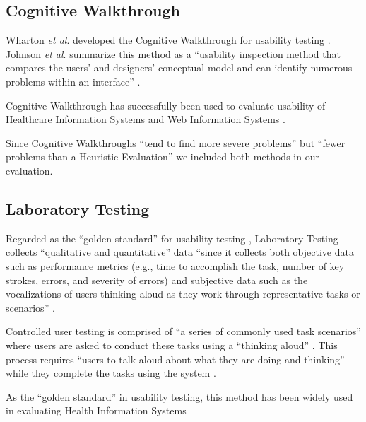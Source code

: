 \documentclass[twocolumn]{bmcart}%
\begin{document}
\subsection*{Cognitive Walkthrough}

Wharton \textit{et al}. developed the Cognitive Walkthrough for usability testing \cite{wharton1994cognitive}. Johnson \textit{et al}. summarize this method as a ``usability inspection method that compares the users’ and designers’ conceptual model and can identify numerous problems within an interface'' \cite{johnson2011ehr, wharton1994cognitive}.

Cognitive Walkthrough has successfully been used to evaluate usability of Healthcare Information Systems \cite{johnson2011ehr, peute2007significance, karahoca2010information, cohen2004cognitive, khajouei2009usability} and Web Information Systems \cite{blackmon2002cognitive}.

Since Cognitive Walkthroughs ``tend to find more severe problems'' \cite{sears1997heuristic, johnson2011ehr} but ``fewer problems than a Heuristic Evaluation'' \cite{beuscart2007human, johnson2011ehr} we included both methods in our evaluation.

\subsection*{Laboratory Testing}

Regarded as the ``golden standard'' for usability testing \citep{newman199810}, Laboratory Testing collects ``qualitative and quantitative'' data ``since it collects both objective data such as performance metrics (e.g., time to accomplish the task, number of key strokes, errors, and severity of errors) and subjective data such as the vocalizations of users thinking aloud as they work through representative tasks or scenarios'' \cite{johnson2011ehr}. 

Controlled user testing is comprised of ``a series of commonly used task scenarios'' where users are asked to conduct these tasks using a ``thinking aloud'' \cite{johnson2011ehr, ericsson1980verbal, nielsen1994usability}. This process requires ``users to talk aloud about what they are doing and thinking'' while they complete the tasks using the system \cite{johnson2011ehr, ericsson1980verbal, nielsen1994usability}.

As the ``golden standard'' in usability testing, this method has been widely used in evaluating Health Information Systems \cite{johnson2011ehr, borycki2009novice, currie2003clinical, hasman2006development, wu2008usability}
\end{document}
